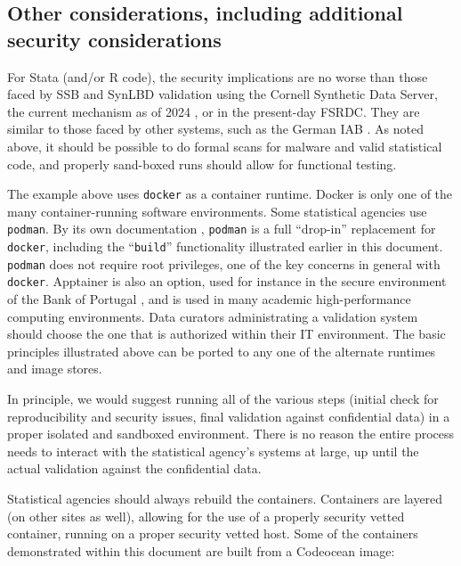 \documentclass[]{hdsr}
\begin{document}
\subsection{Other considerations, including additional security considerations}

For Stata (and/or R code), the security implications are no worse than those  faced by \ac{SSB} and SynLBD validation using the Cornell Synthetic Data Server, the current mechanism as of 2024 \citep{u.s.censusbureauSIPPSyntheticBeta2015b,us_census_bureau_validating_2023}, or in the present-day \ac{FSRDC}. They are similar to those faced by other systems, such as the German IAB \citep{bender_research-data-centre_2011,muller_institute_2021}. As noted above, it should be possible to do formal scans for malware and valid statistical code, and properly sand-boxed runs should allow for functional testing.

The example above uses \texttt{docker} as a container runtime. Docker is only one of the many container-running software environments. Some statistical agencies use \texttt{podman}. By its own documentation , \texttt{podman} is a full ``drop-in'' replacement for  \texttt{docker}, including the ``\texttt{build}'' functionality illustrated earlier in this document. \texttt{podman} does not require root privileges, one of the key concerns in general with \texttt{docker}. Apptainer \citep{noauthor_apptainer_nodate} is also an option, used for instance in the secure environment of the Bank of Portugal \citep{guimaraes_reproducibility_2023}, and is used in many academic high-performance computing environments. Data curators administrating a validation system should choose the one that is authorized within their IT environment. The basic principles illustrated above can be ported to any one of the alternate runtimes and image stores.

In principle, we would suggest running all of the various steps (initial check for reproducibility and security issues, final validation against confidential data) in a proper isolated and sandboxed environment. There is no reason the entire process needs to interact with the statistical agency's systems at large, up until the actual validation against the confidential data.

Statistical agencies should always rebuild the containers. Containers are layered (on other sites as well), allowing for the use of a properly security vetted container, running on a proper security vetted host. Some of the containers demonstrated within this document are built from a Codeocean image:
\end{document}
